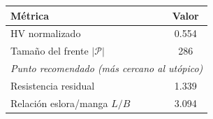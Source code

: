 \begin{tabular}{l c}
\hline
Métrica & Valor \\
\hline
HV normalizado & 0.554 \\
Tamaño del frente $|\mathcal{P}|$ & 286 \\
\hline
\multicolumn{2}{l}{\emph{Punto recomendado (más cercano al utópico)}}\\
\quad Resistencia residual & 1.339 \\
\quad Relación eslora/manga $L/B$ & 3.094 \\
\hline
\end{tabular}